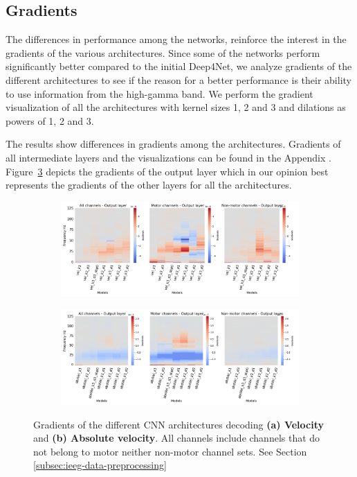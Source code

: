 \subsection{Gradients}\label{subsec:gradients}
The differences in performance among the networks, reinforce the interest in the gradients of the various architectures.
Since some of the networks perform significantly better compared to the initial Deep4Net, we analyze gradients of the different architectures to see if the reason for a better performance is their ability to use information from the high-gamma band.
We perform the gradient visualization of all the architectures with kernel sizes 1, 2 and 3 and dilations as powers of 1, 2 and 3.

The results show differences in gradients among the architectures.
Gradients of all intermediate layers and the visualizations can be found in the Appendix .
Figure~\ref{fig:last-layer-grads} depicts the gradients of the output layer which in our opinion best represents the gradients of the other layers for all the architectures. 

\begin{figure}[!htpb]
\centering
\begin{subfigure}[b]{\textwidth}
   \includegraphics[width=1\linewidth]{img/ch4/vel-last-layer-grads}
   \caption{}
   \label{fig:absVel-last-layer-grads}
\end{subfigure}

\begin{subfigure}[b]{\textwidth}
   \includegraphics[width=1\linewidth]{img/ch4/absVel-last-layer-grads}
   \caption{}
   \label{fig:vel-last-layer-grads}
\end{subfigure}
\caption[]{Gradients of the different CNN architectures decoding \textbf{(a) Velocity} and \textbf{(b) Absolute velocity}. All channels include channels that do not belong to motor neither non-motor channel sets. See Section \ref{subsec:ieeg-data-preprocessing}}
\label{fig:last-layer-grads}
\end{figure}

